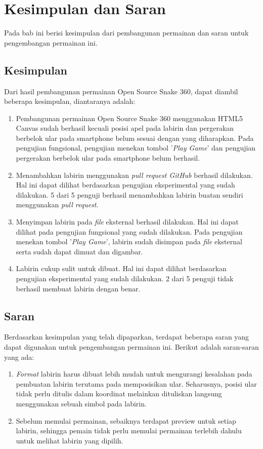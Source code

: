 \chapter{Kesimpulan dan Saran}
\label{chap:kesimpulansaran}

Pada bab ini berisi kesimpulan dari pembangunan permainan dan saran untuk pengembangan permainan ini.

\section{Kesimpulan}
Dari hasil pembangunan permainan Open Source Snake 360, dapat diambil beberapa kesimpulan, diantaranya adalah: 

\begin{enumerate}
	\item Pembangunan permainan Open Source Snake 360 menggunakan HTML5 Canvas sudah berhasil kecuali posisi apel pada labirin dan pergerakan berbelok ular pada smartphone belum sesuai dengan yang diharapkan. Pada pengujian fungsional, pengujian menekan tombol '\textit{Play Game}' dan pengujian pergerakan berbelok ular pada smartphone belum berhasil.
	\item Menambahkan labirin menggunakan \textit{pull request GitHub} berhasil dilakukan. Hal ini dapat dilihat berdasarkan pengujian eksperimental yang sudah dilakukan. 5 dari 5 penguji berhasil menambahkan labirin buatan sendiri menggunakan \textit{pull request}.
	\item Menyimpan labirin pada \textit{file} eksternal berhasil dilakukan. Hal ini dapat dilihat pada pengujian fungsional yang sudah dilakukan. Pada pengujian menekan tombol '\textit{Play Game}', labirin sudah disimpan pada \textit{file} eksternal serta sudah dapat dimuat dan digambar.
	\item Labirin cukup sulit untuk dibuat. Hal ini dapat dilihat berdasarkan pengujian eksperimental yang sudah dilakukan. 2 dari 5 penguji tidak berhasil membuat labirin dengan benar.
\end{enumerate} 

\section{Saran}
Berdasarkan kesimpulan yang telah dipaparkan, terdapat beberapa saran yang dapat digunakan untuk pengembangan permainan ini. Berikut adalah saran-saran yang ada:

\begin{enumerate}
	\item \textit{Format} labirin harus dibuat lebih mudah untuk mengurangi kesalahan pada pembuatan labirin terutama pada memposisikan ular. Seharusnya, posisi ular tidak perlu ditulis dalam koordinat melainkan dituliskan langsung menggunakan sebuah simbol pada labirin.
	\item Sebelum memulai permainan, sebaiknya terdapat preview untuk setiap labirin, sehingga pemain tidak perlu memulai permainan terlebih dahulu untuk melihat labirin yang dipilih.
\end{enumerate}